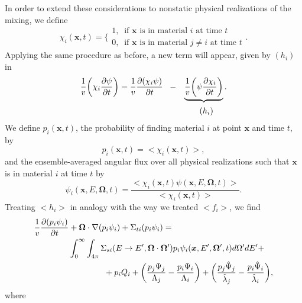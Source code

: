 \documentclass[12pt]{article}
\newcommand{\bl}{\big<}
\newcommand{\bg}{\big>}
\begin{document}
In order to extend these considerations to nonstatic physical realizations of the mixing, we define
\begin{equation}
\chi_i(\bm x,t) =
\Bigg\{
\begin{array}{l}
1, \;\;\textrm{if $\bm x$ is in material $i$ at time $t$}
\\ 0, \;\; \textrm{if $\bm x$ is in material $j\not=i$ at time $t$}
\end{array}.
\end{equation}
Applying the same procedure as before, a new term will appear, given by $(h_i)$ in
\begin{equation}
\begin{split}
\frac{1}{v}\bigg(\chi_i\frac{\partial \psi}{\partial t}\bigg) =
\frac{1}{v}\frac{\partial (\chi_i\psi)}{\partial t}\;\;\; -\;\;\;
&\underbrace{\frac{1}{v}\bigg(\psi\frac{\partial \chi_i}{\partial t}\bigg)}.
\\& \hspace{0.7 cm}(h_i)
\end{split}
\end{equation}
We define $p_i(\bm x,t)$, the probability of finding material $i$ at point $\bm x$ and time $t$, by
\begin{equation}
p_i(\bm x,t) = \bl \chi_i(\bm x,t) \bg ,
\end{equation}
and the ensemble-averaged angular flux over all physical realizations such that $\bm x$
is in material $i$ at time $t$ by
\begin{equation}
\psi_i(\bm x,E,\bm\Omega,t) = \frac{\bl \chi_i(\bm x,t)\psi(\bm x,E,\bm\Omega,t) \bg}{\bl \chi_i(\bm x,t) \bg}.
\end{equation}
Treating $\bl h_i \bg$ in analogy with the way we treated $\bl f_i \bg$, we find
\begin{equation}\label{eq_spat_time}
\begin{split}
\frac{1}{v}\frac{\partial (p_i\psi_i)}{\partial t}&+  \bm\Omega\cdot\nabla(p_i\psi_i) +
\Sigma_{ti}(p_i\psi_i) =
\\& \int_0^{\infty}\int_{4\pi} \Sigma_{si}(E\rightarrow E',\bm\Omega\cdot\bm\Omega')p_i\psi_i(\bm x,E',\bm\Omega',t)d\Omega'dE' +
 \\& \hspace{1.5cm}+p_iQ_i +
\bigg(\frac{p_j\Psi_j}{\Lambda_j} -  \frac{p_i\Psi_i}{\Lambda_i}\bigg)+
\bigg(\frac{p_j\hat\Psi_j}{\hat\lambda_j} -  \frac{p_i\hat\Psi_i}{\hat\lambda_i}\bigg),
\end{split}
\end{equation}
where
\end{document}
